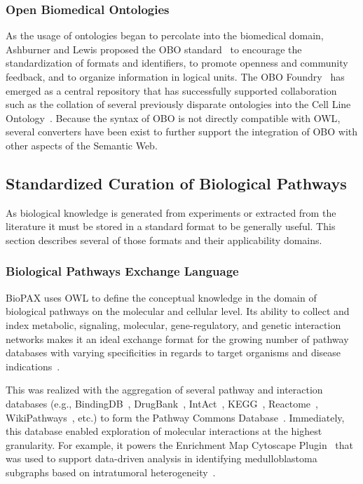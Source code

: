 \subsubsection{Open Biomedical Ontologies}

As the usage of ontologies began to percolate into the biomedical domain, Ashburner and Lewis proposed the \ac{OBO} standard~\cite{Ashburner2003} to encourage the standardization of formats and identifiers, to promote openness and community feedback, and to organize information in logical units.
The OBO Foundry~\cite{Smith2007} has emerged as a central repository that has successfully supported collaboration such as the collation of several previously disparate ontologies into the Cell Line Ontology~\cite{Sarntivijai2014}.
Because the syntax of \ac{OBO} is not directly compatible with \ac{OWL}, several converters have been exist to further support the integration of \ac{OBO} with other aspects of the Semantic Web.

\subsection{Standardized Curation of Biological Pathways}

As biological knowledge is generated from experiments or extracted from the literature it must be stored in a standard format to be generally useful.
This section describes several of those formats and their applicability domains.

\subsubsection{Biological Pathways Exchange Language}

\ac{BioPAX} uses \ac{OWL} to define the conceptual knowledge in the domain of biological pathways on the molecular and cellular level.
Its ability to collect and index metabolic, signaling, molecular, gene-regulatory, and genetic interaction networks makes it an ideal exchange format for the growing number of pathway databases with varying specificities in regards to target organisms and disease indications~\cite{Demir2010}.

This was realized with the aggregation of several pathway and interaction databases (e.g., BindingDB~\cite{Gilson2016}, DrugBank~\cite{Law2014}, IntAct~\cite{Orchard2014}, \ac{KEGG}~\cite{Kanehisa2017}, Reactome~\cite{Fabregat2016}, WikiPathways~\cite{Pico2008}, etc.) to form the Pathway Commons Database~\cite{Cerami2011}.
Immediately, this database enabled exploration of molecular interactions at the highest granularity.
For example, it powers the Enrichment Map Cytoscape Plugin~\cite{Merico2010} that was used to support data-driven analysis in identifying medulloblastoma subgraphs based on intratumoral heterogeneity~\cite{Cavalli2017}.

